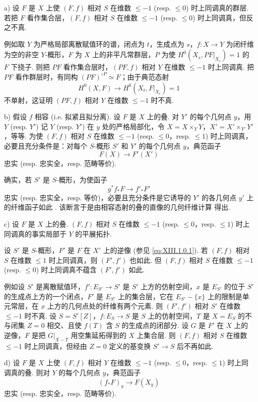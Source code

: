 \begin{remark}\label{rem:XIII.1.5}
a) 设 $F$ 是 $X$ 上使 $(F, f)$ 相对 $S$ 在维数 $\leqslant -1$ (resp. $\leqslant 0$) 时上同调真的群层. 若把 $F$ 看作集合层，$(F, f)$ 相对 $S$ 在维数 $\leqslant -1$ (resp. $\leqslant 0$) 时上同调真，但反之不真.

例如取 $Y$ 为严格局部离散赋值环的谱，闭点为 $t$，生成点为 $s$，$f \colon X \to Y$ 为闭纤维为空的非空 $Y$-概形，$F$ 为 $X$ 上的非平凡常群层，$P$ 为使 $H^0(X_s, P F|_{X_s}) = 1$ 的 $F$ 下挠子. 则把 $P F$ 看作集合层时，$(P F, f)$ 相对 $Y$ 在维数 $\leqslant -1$ 时上同调真. 把 $P F$ 看作群层时，有同构 $(P F)^{\circ P} \simeq F$；由于典范态射
\[
H^0(X, F) \longrightarrow H^0(X_t, F|_{X_t}) = 1
\]
不单射，这证明 $(P F, f)$ 相对 $Y$ 在维数 $\leqslant -1$ 时不真.

b) 假设 $f$ 相容 (i.e. 拟紧且拟分离). 设 $F$ 是 $X$ 上的叠. 对 $Y'$ 的每个几何点 $y$，用 $Y$ (resp. $Y'$) 记 $Y$ (resp. $Y'$) 在 $y$ 处的严格局部化，令 $X = X \times_Y Y$，$X' = X' \times_{Y'} Y'$，等等. 为使 $(F, f)$ 相对 $S$ 在维数 $\leqslant -1$ (resp. $\leqslant 0$，resp. $\leqslant 1$) 时上同调真，必要且充分条件是：对每个 $S$-概形 $S'$ 和 $Y'$ 的每个几何点 $y$，典范函子
\[
F(X) \longrightarrow F'(X')
\]
忠实 (resp. 忠实全，resp. 范畴等价).

确实，若 $S'$ 是 $S$-概形，为使函子
\[
g^{*} f_* F \longrightarrow f'_* F'
\]
忠实 (resp. 忠实全，resp. 等价)，必要且充分条件是它诱导的 $Y'$ 的各几何点 $y'$ 上的纤维函子如此 \cite[III 2.1.5.9]{exp13-2}. 该断言于是由相容态射的叠的直像的几何纤维计算 \cite[VII 2.1.5]{exp13-2} 得出.

c) 设 $F$ 是 $X$ 上的叠. $(F, f)$ 相对 $S$ 在维数 $\leqslant -1$ (resp. $\leqslant 0$，resp. $\leqslant 1$) 时上同调真的事实局部于 $Y$ 的平展拓扑.

设 $S'$ 是 $S$-概形，$F'$ 是 $F$ 在 $X'$ 上的逆像 (参见 \eqref{eq:XIII.1.0.1}). 若 $(F, f)$ 相对 $S$ 在维数 $\leqslant 1$ 时上同调真，则 $(F', f')$ 也如此. 但 $(F, f)$ 相对 $S$ 在维数 $\leqslant -1$ (resp. $\leqslant 0$) 时上同调真不蕴含 $(F', f')$ 如此.

例如设 $S'$ 是离散赋值环，$f' \colon E_{S'} \to S'$ 是 $S'$ 上方的仿射空间，$x$ 是 $E_{S'}$ 的位于 $S'$ 的生成点上方的一个闭点，$F'$ 是 $E_{S'}$ 上的集合层，它在 $E_{S'} - \{x\}$ 上的限制是单元常层，在 $x$ 上方的几何点处的纤维有两个元素. 则 $(F', f')$ 相对 $S'$ 在维数 $\leqslant -1$ 时不真. 设 $S = S'[Z]$，$f \colon E_S \to S$ 是 $S$ 上的仿射空间，$T$ 是 $X = E_S$ 的不与闭集 $Z = 0$ 相交、且使 $f(T)$ 含 $S$ 的生成点的闭部分. 设 $G$ 是 $F'$ 在 $X$ 上的逆像，$F$ 是把 $G|_{X - T}$ 用空集延拓得到的 $X$ 上集合层. 则 $(F, f)$ 相对 $S$ 在维数 $\leqslant -1$ 时上同调真，但经由 $Z = 0$ 定义的基变换 $S' \to S$ 后不再如此.

d) 设 $F$ 是 $X$ 上使 $(F, f)$ 相对 $Y$ 在维数 $\leqslant -1$ (resp. $\leqslant 0$，resp. $\leqslant 1$) 时上同调真的叠. 则对 $Y$ 的每个几何点 $y$，典范函子
\[
(f_* F)_y \longrightarrow F(X_y)
\]
忠实 (resp. 忠实全，resp. 范畴等价).
\end{remark}

